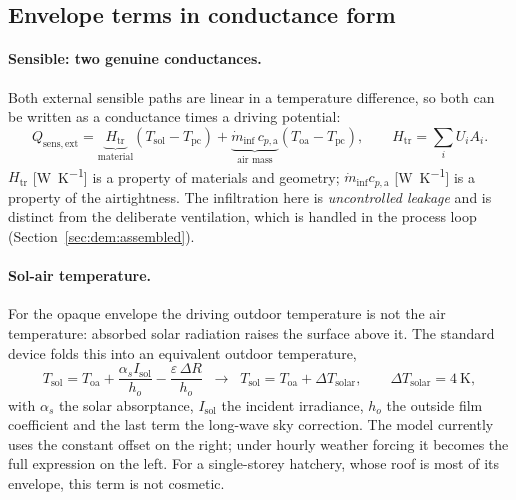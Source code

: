 \documentclass[11pt]{article}
\begin{document}
\subsection{Envelope terms in conductance form}
\label{sec:dem:envelope}

\paragraph{Sensible: two genuine conductances.} Both external sensible paths are
linear in a temperature difference, so both can be written as a conductance times
a driving potential:
\begin{equation}
Q_{\mathrm{sens,ext}}
=\underbrace{H_{\mathrm{tr}}}_{\text{material}}\left(T_{\mathrm{sol}}-T_{\mathrm{pc}}\right)
+\underbrace{\dot m_{\mathrm{inf}}\,c_{p,\mathrm{a}}}_{\text{air mass}}
\left(T_{\mathrm{oa}}-T_{\mathrm{pc}}\right),
\qquad H_{\mathrm{tr}}=\sum_i U_iA_i .
\label{eq:dem:Qsensext}
\end{equation}
$H_{\mathrm{tr}}$ [\si{\watt\per\kelvin}] is a property of materials and
geometry; $\dot m_{\mathrm{inf}}c_{p,\mathrm{a}}$ [\si{\watt\per\kelvin}] is a
property of the airtightness. The infiltration here is \emph{uncontrolled
leakage} and is distinct from the deliberate ventilation, which is handled in the
process loop (Section~\ref{sec:dem:assembled}).

\paragraph{Sol-air temperature.} For the opaque envelope the driving outdoor
temperature is not the air temperature: absorbed solar radiation raises the
surface above it. The standard device folds this into an equivalent outdoor
temperature,
\begin{equation}
T_{\mathrm{sol}}=T_{\mathrm{oa}}
+\frac{\alpha_s I_{\mathrm{sol}}}{h_o}-\frac{\varepsilon\,\Delta R}{h_o}
\;\;\longrightarrow\;\;
T_{\mathrm{sol}}=T_{\mathrm{oa}}+\Delta T_{\mathrm{solar}},
\qquad \Delta T_{\mathrm{solar}}=\SI{4}{\kelvin},
\label{eq:dem:solair}
\end{equation}
with $\alpha_s$ the solar absorptance, $I_{\mathrm{sol}}$ the incident
irradiance, $h_o$ the outside film coefficient and the last term the long-wave
sky correction. The model currently uses the constant offset on the right; under
hourly weather forcing it becomes the full expression on the left. For a
single-storey hatchery, whose roof is most of its envelope, this term is not
cosmetic.
\end{document}
